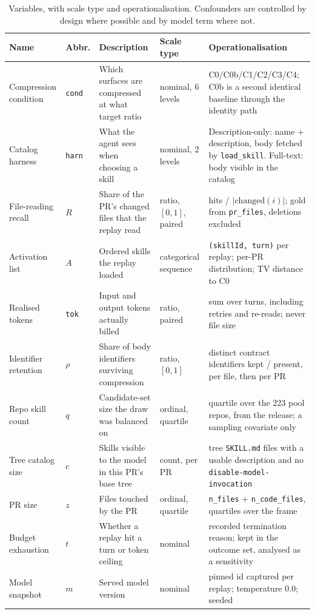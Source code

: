 \documentclass[10pt,conference]{IEEEtran}
\begin{document}
\begin{table}[t]
\caption{Variables, with scale type and operationalisation. Confounders are controlled by design where possible and by model term where not.}
\label{tab:vars}
\centering
\scriptsize
\begin{tabular}{@{}p{2.3cm}p{0.9cm}p{3.3cm}p{2.1cm}p{7.3cm}@{}}
\toprule
Name & Abbr. & Description & Scale type & Operationalisation \\
\midrule
Compression condition & \texttt{cond} & Which surfaces are compressed at what target ratio & nominal, 6 levels & C0/C0b/C1/C2/C3/C4; C0b is a second identical baseline through the identity path \\
Catalog harness & \texttt{harn} & What the agent sees when choosing a skill & nominal, 2 levels & Description-only: name + description, body fetched by \texttt{load\_skill}. Full-text: body visible in the catalog \\
\midrule
File-reading recall & $R$ & Share of the PR's changed files that the replay read & ratio, $[0,1]$, paired & hits / $|\mathrm{changed}(i)|$; gold from \texttt{pr\_files}, deletions excluded \\
Activation list & $A$ & Ordered skills the replay loaded & categorical sequence & \texttt{(skillId, turn)} per replay; per-PR distribution; TV distance to C0 \\
Realised tokens & \texttt{tok} & Input and output tokens actually billed & ratio, paired & sum over turns, including retries and re-reads; never file size \\
Identifier retention & $\rho$ & Share of body identifiers surviving compression & ratio, $[0,1]$ & distinct contract identifiers kept / present, per file, then per PR \\
\midrule
Repo skill count & $q$ & Candidate-set size the draw was balanced on & ordinal, quartile & quartile over the 223 pool repos, from the release; a sampling covariate only \\
Tree catalog size & $c$ & Skills visible to the model in this PR's base tree & count, per PR & tree \texttt{SKILL.md} files with a usable description and no \texttt{disable-model-invocation} \\
PR size & $z$ & Files touched by the PR & ordinal, quartile & \texttt{n\_files} + \texttt{n\_code\_files}, quartiles over the frame \\
Budget exhaustion & $t$ & Whether a replay hit a turn or token ceiling & nominal & recorded termination reason; kept in the outcome set, analysed as a sensitivity \\
Model snapshot & $m$ & Served model version & nominal & pinned id captured per replay; temperature 0.0; seeded \\
\bottomrule
\end{tabular}
\end{table}
\end{document}
